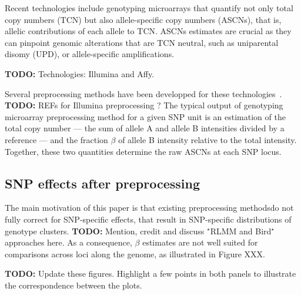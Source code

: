 \documentclass[10pt]{bmc_article}
\newenvironment{bmcformat}{\fussy\setboolean{publ}{true}}{\fussy}
\newenvironment{TODO}{\color{red}\textbf{TODO:}}{}
\begin{document}
\begin{bmcformat}
Recent technologies include genotyping microarrays that quantify not only total copy numbers (TCN) but also allele-specific copy numbers (ASCNs), that is, allelic contributions of each allele to TCN. ASCNs estimates are crucial as they can pinpoint genomic alterations that are TCN neutral, such as uniparental disomy (UPD), or allele-specific amplifications.

\begin{TODO}
  Technologies: Illumina and Affy.
\end{TODO}

Several preprocessing methods have been developped for these technologies~\cite{Affymetrix_2008m,BengtssonH_etal_2009b,BengtssonH_etal_2008,KornJ_etal_2008,LiWong_2001}.
\begin{TODO}
  REFs for Illumina preprocessing ?
\end{TODO}
The typical output of genotyping microarray preprocessing method for a given SNP unit is an estimation of the total copy number --- the sum of allele A and allele B intensities divided by a reference --- and the fraction $\beta$ of allele B intensity relative to the total intensity. Together, these two quantities determine the raw ASCNs at each SNP locus.

\subsection*{SNP effects after preprocessing}

The main motivation of this paper is that existing preprocessing methodsdo not fully correct for SNP-specific effects, that result in SNP-specific distributions of genotype clusters.
\begin{TODO}
  Mention, credit and discuss $^\star$RLMM and Bird$^\star$ approaches here.
\end{TODO}
 As a consequence, $\beta$ estimates are not well suited for comparisons across loci along the genome, as illustrated in Figure XXX. 

\begin{TODO}
Update these figures. Highlight a few points in both panels to illustrate the correspondence between the plots.
\end{TODO}


\end{bmcformat}
\end{document}

